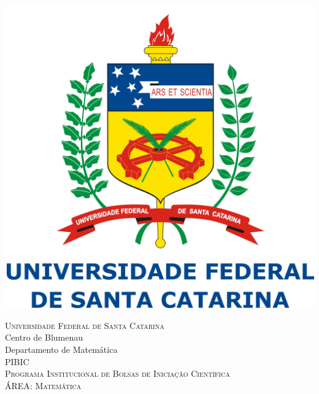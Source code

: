 \documentclass[11pt]{article}
\begin{document}
%

\begin{titlepage}

\newcommand{\HRule}{\rule{\linewidth}{0.5mm}} %

\center %
 

\begin{center}
\includegraphics[scale=0.22]{logoufsc}
\end{center}

\vspace{1cm}

\textsc{\LARGE Universidade Federal de Santa Catarina}\\[0.5cm] %
{\Large Centro de Blumenau \\ Departamento de Matemática}\\[1.5cm] %
\textsc{\Large PIBIC \\ Programa Institucional de Bolsas de Iniciação Científica \vspace{1.5cm} \\ {ÁREA: Matemática}}\\[2.0cm] %


\end{titlepage}
\end{document}
